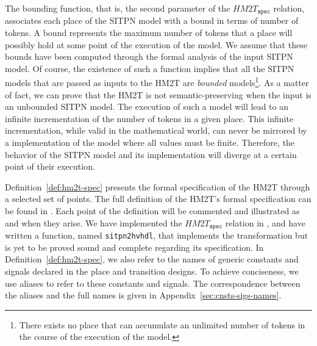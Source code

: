 \documentclass[pdflatex,sn-mathphys]{sn-jnl}%
\theoremstyle{thmstyleone}%
\theoremstyle{thmstyletwo}%
\theoremstyle{thmstylethree}%
\begin{document}
The bounding function, that is, the second parameter of the
$HM2T_{\mathtt{spec}}$ relation, associates each place of the SITPN
model with a bound in terms of number of tokens.  A bound represents
the maximum number of tokens that a place will possibly hold at some
point of the execution of the model. We assume that these bounds have
been computed through the formal analysis of the input SITPN model. Of
course, the existence of such a function implies that all the SITPN
models that are passed as inputs to the HM2T are \textit{bounded}
models\footnote{There exists no place that can accumulate an unlimited
  number of tokens in the course of the execution of the model.}. As a
matter of fact, we can prove that the HM2T is not semantic-preserving
when the input is an unbounded SITPN model. The execution of such a
model will lead to an infinite incrementation of the number of tokens
in a given place. This infinite incrementation, while valid in the
mathematical world, can never be mirrored by a \vhdl{} implementation
of the model where all values must be finite. Therefore, the behavior
of the SITPN model and its \hvhdl{} implementation will diverge at a
certain point of their execution.

\bigskip

Definition~\ref{def:hm2t-spec} presents the formal specification of
the HM2T through a selected set of points. The full definition of the
HM2T's formal specification can be found in
\cite{Iampietro2022hfspec}. Each point of the definition will be
commented and illustrated as and when they arise. We have implemented
the $HM2T_{\mathtt{spec}}$ relation in \coq{}, and have written a
\coq{} function, named \texttt{sitpn2hvhdl}, that implements the
transformation but is yet to be proved sound and complete regarding
its specification. In Definition~\ref{def:hm2t-spec}, we also refer to
the names of generic constants and signals declared in the place and
transition designs. To achieve conciseness, we use aliases to refer to
these constants and signals. The correspondence between the aliases
and the full names is given in Appendix~\ref{sec:cnsts-sigs-names}.


\def\pdiInBeh{\mathtt{comp}(\gamma(p),\mathtt{place},g_p,i_p,o_p)\in{}d.beh}
\def\tdiInBeh{\mathtt{comp}(\gamma(t),\mathtt{transition},g_t,i_t,o_t)\in{}d.beh}
\def\tdiInBehP#1{\mathtt{comp}(\gamma(#1),\mathtt{transition},g_{#1},i_{#1},o_{#1})\in{}d.beh}
\end{document}
